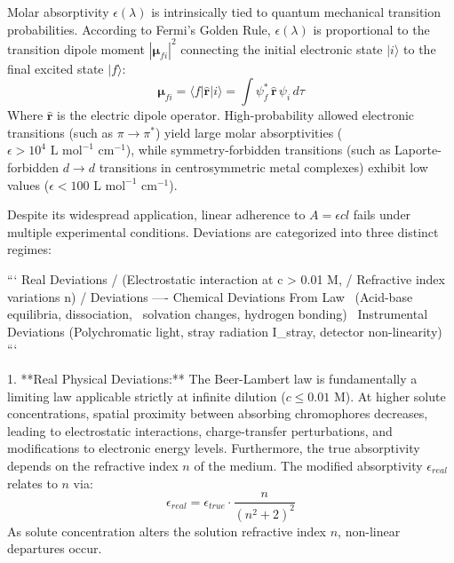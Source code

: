 \documentclass[12pt]{article}
\begin{document}
Molar absorptivity $\epsilon(\lambda)$ is intrinsically tied to quantum mechanical transition probabilities. According to Fermi's Golden Rule, $\epsilon(\lambda)$ is proportional to the transition dipole moment $|\boldsymbol{\mu}_{fi}|^2$ connecting the initial electronic state $|i\rangle$ to the final excited state $|f\rangle$:
\begin{equation}
\boldsymbol{\mu}_{fi} = \langle f | \hat{\mathbf{r}} | i \rangle = \int \psi_f^* \, \hat{\mathbf{r}} \, \psi_i \, d\tau
\end{equation}
Where $\hat{\mathbf{r}}$ is the electric dipole operator. High-probability allowed electronic transitions (such as $\pi \rightarrow \pi^*$) yield large molar absorptivities ($\epsilon > 10^4 \text{ L mol}^{-1} \text{ cm}^{-1}$), while symmetry-forbidden transitions (such as Laporte-forbidden $d \rightarrow d$ transitions in centrosymmetric metal complexes) exhibit low values ($\epsilon < 100 \text{ L mol}^{-1} \text{ cm}^{-1}$).

Despite its widespread application, linear adherence to $A = \epsilon c l$ fails under multiple experimental conditions. Deviations are categorized into three distinct regimes:

```
                  Real Deviations
                 / (Electrostatic interaction at c > 0.01 M,
                /   Refractive index variations n)
               /
Deviations ---- Chemical Deviations
From Law       \ (Acid-base equilibria, dissociation,
                \  solvation changes, hydrogen bonding)
                 \
                  Instrumental Deviations
                  (Polychromatic light, stray radiation I_stray,
                   detector non-linearity)
```

1. **Real Physical Deviations:** The Beer-Lambert law is fundamentally a limiting law applicable strictly at infinite dilution ($c \le 0.01 \text{ M}$). At higher solute concentrations, spatial proximity between absorbing chromophores decreases, leading to electrostatic interactions, charge-transfer perturbations, and modifications to electronic energy levels. Furthermore, the true absorptivity depends on the refractive index $n$ of the medium. The modified absorptivity $\epsilon_{real}$ relates to $n$ via:
\begin{equation}
\epsilon_{real} = \epsilon_{true} \cdot \frac{n}{(n^2 + 2)^2}
\end{equation}
As solute concentration alters the solution refractive index $n$, non-linear departures occur.
\end{document}
